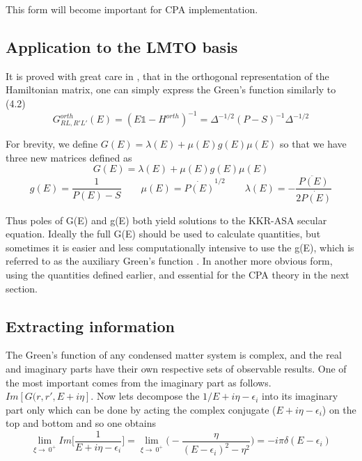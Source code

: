 \documentclass[12pt]{article}
\begin{document}
This form will become important for CPA implementation.

\subsection{Application to the LMTO basis}

It is proved with great care in \cite{turek}, that in the orthogonal representation of the Hamiltonian matrix, one can simply express the Green's function similarly to (4.2)
\begin{equation} \label{4.1} \tag{4.9}
G^{orth}_{RL,R'L'}(E)=(E\mathds{1}-H^{orth})^{-1}=\Delta^{-1/2}(P-S)^{-1}\Delta^{-1/2}
\end{equation}


For brevity, we define $G(E)= \lambda(E) +\mu(E)g(E)\mu(E)$ so that we have three new matrices defined as\cite{drchal}
\begin{equation} \label{4.1} \tag{4.10}
G(E)= \lambda(E) +\mu(E)g(E)\mu(E)
\end{equation}
\begin{equation} \label{4.1} \tag{4.11}
g(E)=\frac{1}{P(E)-S} \qquad \mu(E)= \dot{P(E)}^{1/2} \qquad \lambda(E)=- \frac{\ddot{P(E)}}{2\dot{P(E)}}
\end{equation}

Thus poles of G(E) and g(E) both yield solutions to the KKR-ASA secular equation. Ideally the full G(E) should be used to calculate quantities, but sometimes it is easier and less computationally intensive to use the g(E), which is referred to as the auxiliary Green's function \cite{andersen}. In another more obvious form, using the quantities defined earlier, and essential for the CPA theory in the next section.

\subsection{Extracting information}

The Green's function of any condensed matter system is complex, and the real and imaginary parts have their own respective sets of observable results. One of the most important comes from the imaginary part as follows. 
$Im[G(r,r',E+i\eta]$. Now lets decompose the $1/E+i\eta-\epsilon_i$ into its imaginary part only which can be done by acting the complex conjugate ($E+i\eta-\epsilon_i$) on the top and bottom and so one obtains 
\begin{equation} \label{4.1} \tag{4.12}
\lim_{\xi\to\ 0^+}Im\bigg[\frac{1}{E+i\eta-\epsilon_i}\bigg]=\lim_{\xi\to\ 0^+}\bigg(-\frac{\eta}{(E-\epsilon_i)^2-\eta^2}\bigg)=-i\pi \delta(E-\epsilon_i)
\end{equation}
\end{document}
